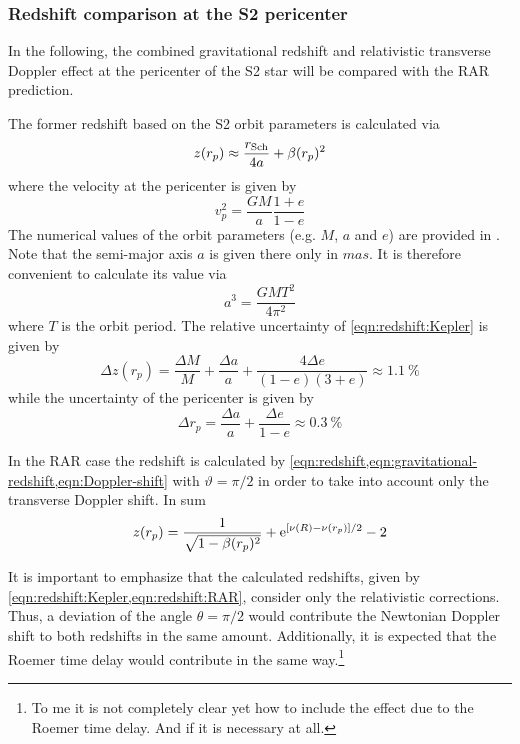 \documentclass[nofootinbib,tightenlines,nobibnotes,aps,prl,preprint,groupedaddress]{revtex4-1}
\begin{document}
\subsubsection*{Redshift comparison at the S2 pericenter}
In the following, the combined gravitational redshift and relativistic transverse Doppler effect at the pericenter of the S2 star will be compared with the RAR prediction.

The former redshift based on the S2 orbit parameters is calculated via \begin{equation}
	\label{eqn:redshift:Kepler}
	z(r_p) \approx \frac{r_{\rm Sch}}{4a} + \beta(r_p)^2
\end{equation} where the velocity at the pericenter is given by \begin{equation}
	v_p^2 = \frac{G M}{a} \frac{1 + e}{1 - e}
\end{equation} The numerical values of the orbit parameters (e.g. $M$, $a$ and $e$) are provided in \citet[][Table A.1]{2018A&A...615L..15G}. Note that the semi-major axis $a$ is given there only in $mas$. It is therefore convenient to calculate its value via \begin{equation}
	a^3 = \frac{G M T^2}{4 \pi^2}
\end{equation} where $T$ is the orbit period. The relative uncertainty of \cref{eqn:redshift:Kepler} is given by \begin{equation}
	\Delta z(r_p) = \frac{\Delta M}{M} + \frac{\Delta a}{a} + \frac{4 \Delta e}{(1 - e)(3 + e)} \approx \SI{1.1}{\percent}
\end{equation} while the uncertainty of the pericenter is given by \begin{equation}
	\Delta r_p = \frac{\Delta a}{a} + \frac{\Delta e}{1 - e} \approx \SI{0.3}{\percent}
\end{equation}

In the RAR case the redshift is calculated by \cref{eqn:redshift,eqn:gravitational-redshift,eqn:Doppler-shift} with $\vartheta = \pi/2$ in order to take into account only the transverse Doppler shift. In sum \begin{equation}
	\label{eqn:redshift:RAR}
	z(r_p) = \frac{1}{\sqrt{1 - \beta(r_p)^2}} + \mathrm{e}^{[\nu(R) - \nu(r_p)]/2} - 2
\end{equation}

It is important to emphasize that the calculated redshifts, given by \cref{eqn:redshift:Kepler,eqn:redshift:RAR}, consider only the relativistic corrections. Thus, a deviation of the angle $\theta=\pi/2$ would contribute the Newtonian Doppler shift to both redshifts in the same amount. Additionally, it is expected that the Roemer time delay would contribute in the same way.\footnote{To me it is not completely clear yet how to include the effect due to the Roemer time delay. And if it is necessary at all.}
\end{document}
